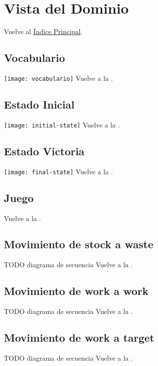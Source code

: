 \newpage{}
\section{Vista del Dominio}\label{domaintoc}

\secttoc
Vuelve al \hyperlink{toc}{Índice Principal}.

\newpage{}
\subsection{Vocabulario}
\texttt{[image: vocabulario]}
Vuelve a la .

\newpage{}
\subsection{Estado Inicial}
\texttt{[image: initial-state]}
Vuelve a la .

\newpage{}
\subsection{Estado Victoria}
\texttt{[image: final-state]}
Vuelve a la .

\newpage{}
\begin{landscape}    
\subsection{Juego}
\begin{center}
\end{center}
Vuelve a la .
\end{landscape}

\newpage{}
\subsection{Movimiento de stock a waste}
TODO diagrama de secuencia
Vuelve a la .

\newpage{}
\subsection{Movimiento de work a work}
TODO diagrama de secuencia
Vuelve a la .

\newpage{}
\subsection{Movimiento de work a target}
TODO diagrama de secuencia
Vuelve a la .
